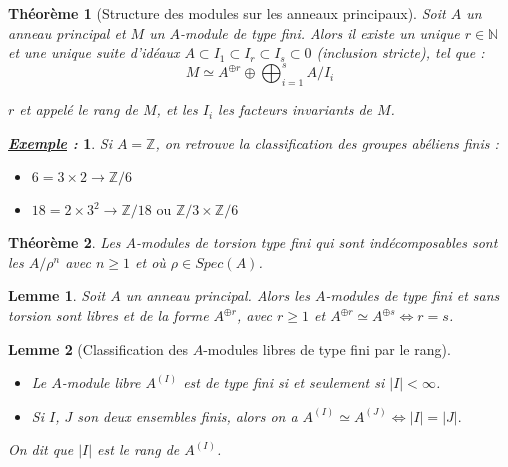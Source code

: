 \documentclass{article}           %
\newcommand\N{\mathbb{N}}
\newcommand\Z{\mathbb{Z}}
\theoremstyle{break}
\theoremstyle{add}
\theoremstyle{break} %
\newtheorem{theoreme}{Théorème}[section]
\newtheorem{lemme}{Lemme}[section]
\theoremstyle{add}
\newtheorem*{exemple}{\textit{\underline{Exemple} :}}
\newcommand\NL{
\mbox{}
\vspace*{-\parsep}
\vspace*{-\baselineskip}}
\begin{document}
\begin{theoreme}[Structure des modules sur les anneaux principaux]
Soit $A$ un anneau principal et $M$ un $A$-module de type fini. Alors il existe un unique $r \in \N$ et une unique suite d'idéaux $A \subset I_1 \subset I_r \subset I_s \subset 0$ (inclusion stricte), tel que : \\
$$ M \simeq A^{\oplus r} \oplus \bigoplus_{i=1}^s A/I_i $$

$r$ et appelé le \textit{rang} de $M$, et les $I_i$ les \textit{facteurs invariants} de $M$.
\end{theoreme}

\begin{exemple}
Si $A=\Z$, on retrouve la classification des groupes abéliens finis :
\begin{itemize}
\item $6 = 3 \times 2 \longrightarrow \Z/6$
\item $18 = 2 \times 3^2 \longrightarrow \Z/18 \textrm{ ou } \Z/3 \times \Z/6$
\end{itemize}
\end{exemple}


\begin{theoreme}
Les $A$-modules de torsion type fini qui sont indécomposables sont les $A/\rho^n$ avec $n \geq 1$ et où $\rho \in Spec(A)$. \\
\end{theoreme}  


\begin{lemme}
Soit $A$ un anneau principal. Alors les $A$-modules de type fini et sans torsion sont libres et de la forme $A^{\oplus r}$, avec $r \geq 1$ et $A^{\oplus r} \simeq A^{\oplus s} \Longleftrightarrow r = s$. \\
\end{lemme}

\begin{lemme}[Classification des $A$-modules libres de type fini par le rang] \NL
\begin{itemize}
\item Le $A$-module libre $A^{(I)}$ est de type fini si et seulement si $|I| < \infty$.
\item Si $I$, $J$ son deux ensembles finis, alors on a $A^{(I)} \simeq A^{(J)} \Longleftrightarrow |I| =|J|.$
\end{itemize}
On dit que $|I|$ est le rang de $A^{(I)}$. \\
\end{lemme}
\end{document}
